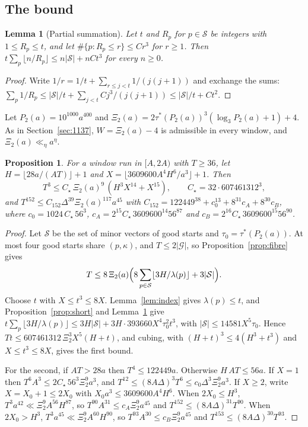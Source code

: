 \documentclass[11pt]{amsart}
\newtheorem{lemma}[theorem]{Lemma}
\newtheorem{proposition}[theorem]{Proposition}
\theoremstyle{definition}
\theoremstyle{remark}
\begin{document}
\subsection{The bound}

\begin{lemma}[Partial summation]\label{lem:abel}
Let $t$ and $R_p$ for $p\in\mathcal S$ be integers with $1\le R_p\le t$, and let
$\#\{p:R_p\le r\}\le Cr^3$ for $r\ge1$. Then
$t\sum_p\lfloor n/R_p\rfloor\le n|\mathcal S|+nCt^3$ for every $n\ge0$.
\end{lemma}

\begin{proof}
Write $1/r=1/t+\sum_{r\le j<t}1/(j(j+1))$ and exchange the sums:
$\sum_p1/R_p\le|\mathcal S|/t+\sum_{j<t}Cj^3/(j(j+1))\le|\mathcal S|/t+Ct^2$.
\end{proof}

Let $P_2(a)=10^{1000}a^{400}$ and $\Xi_2(a)=2\tau^*(P_2(a))^3(\log_3P_2(a)+1)+4$. As in
Section~\ref{sec:1137}, $W=\Xi_2(a)-4$ is admissible in every window, and
$\Xi_2(a)\ll_\eta a^\eta$.

\begin{proposition}\label{prop:twostate4}
For a window run in $[A,2A)$ with $T\ge36$, let $H=\lfloor28a/(AT)\rfloor+1$ and
$X=\lfloor3609600A^4H^6/a^3\rfloor+1$. Then
\[
T^3\le C_\star\,\Xi_2(a)^9\,(H^3X^{14}+X^{15}),\qquad C_\star=32\cdot607461312^3 ,
\]
and $T^{152}\le C_{152}\Delta^{39}\Xi_2(a)^{117}a^{45}$ with $C_{152}=122449^{38}+c_0^{13}+8^{31}c_A+8^{30}c_B$, where
$c_0=1024\,C_\star\,56^3$, $c_A=2^{15}C_\star\,3609600^{14}56^{87}$ and $c_B=2^{16}C_\star\,3609600^{15}56^{90}$.
\end{proposition}

\begin{proof}
Let $\mathcal S$ be the set of minor vectors of good starts and $\tau_0=\tau^*(P_2(a))$. At most
four good starts share $(p,\kappa)$, and $T\le2|\mathcal G|$, so Proposition~\ref{prop:fibre}
gives
\[
T\le8\,\Xi_2(a)\Bigl(8\sum_{p\in\mathcal S}\lfloor3H/\lambda(p)\rfloor+3|\mathcal S|\Bigr).
\]
Choose $t$ with $X\le t^3\le8X$. Lemma~\ref{lem:index} gives $\lambda(p)\le t$, and
Proposition~\ref{prop:short} and Lemma~\ref{lem:abel} give
$t\sum_p\lfloor3H/\lambda(p)\rfloor\le3H|\mathcal S|+3H\cdot393660X^4\tau_0^2t^3$, with
$|\mathcal S|\le14581X^5\tau_0$. Hence $Tt\le607461312\,\Xi_2^3X^5(H+t)$, and cubing, with
$(H+t)^3\le4(H^3+t^3)$ and $X\le t^3\le8X$, gives the first bound.

For the second, if $AT>28a$ then $T^4\le122449a$. Otherwise $H\,AT\le56a$. If $X=1$ then
$T^6A^3\le2C_\star\,56^3\Xi_2^9a^3$, and $T^{12}\le(8A\Delta)^3T^6\le c_0\Delta^3\Xi_2^9a^3$. If
$X\ge2$, write $X=X_0+1\le2X_0$ with $X_0a^3\le3609600A^4H^6$. When $2X_0\le H^3$,
$T^3a^{42}\ll\Xi_2^9A^{56}H^{87}$, so $T^{90}A^{31}\le c_A\Xi_2^9a^{45}$ and
$T^{152}\le(8A\Delta)^{31}T^{90}$. When $2X_0>H^3$, $T^3a^{45}\ll\Xi_2^9A^{60}H^{90}$, so
$T^{93}A^{30}\le c_B\Xi_2^9a^{45}$ and $T^{153}\le(8A\Delta)^{30}T^{93}$.
\end{proof}
\end{document}
